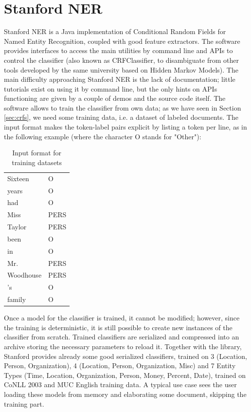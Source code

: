 \documentclass[a4paper,11pt]{report}
\begin{document}
\section{Stanford NER}
\label{sec:StfdNER}
Stanford NER \cite{finkel2005incorporating} is a Java implementation of Conditional Random Fields for Named Entity Recognition, coupled with good feature extractors. The software provides interfaces to access the main utilities by command line and APIs to control the classifier (also known as CRFClassifier, to disambiguate from other tools developed by the same university based on Hidden Markov Models).
The main difficulty approaching Stanford NER is the lack of documentation; little tutorials exist on using it by command line, but the only hints on APIs functioning are given by a couple of demos and the source code itself.
The software allows to train the classifier from own data; as we have seen in Section \ref{sec:crfs}, we need some training data, i.e. a dataset of labeled documents. The input format makes the token-label pairs explicit by listing a token per line, as in the following example (where the character O stands for "Other"):
\begin{table}[h]
\begin{center}
\begin{tabular}{ll}
Sixteen &	O\\
years	& O\\
had	&O\\
Miss	&PERS\\
Taylor	&PERS\\
been	&O\\
in	&O\\
Mr.	&PERS\\
Woodhouse	&PERS\\
's	&O\\
family	&O\\
\end{tabular}
\end{center}
\caption{Input format for training datasets}
\label{tab:inputfmt}
\end{table}
Once a model for the classifier is trained, it cannot be modified; however, since the training is deterministic, it is still possible to create new instances of the classifier from scratch. Trained classifiers are serialized and compressed into an archive storing the necessary parameters to reload it.
Together with the library, Stanford provides already some good serialized classifiers, trained on 3 (Location, Person, Organization), 4 (Location, Person, Organization, Misc) and 7 Entity Types (Time, Location, Organization, Person, Money, Percent, Date), trained on CoNLL 2003 and MUC English training data. A typical use case sees the user loading these models from memory and elaborating some document, skipping the training part.
\end{document}

